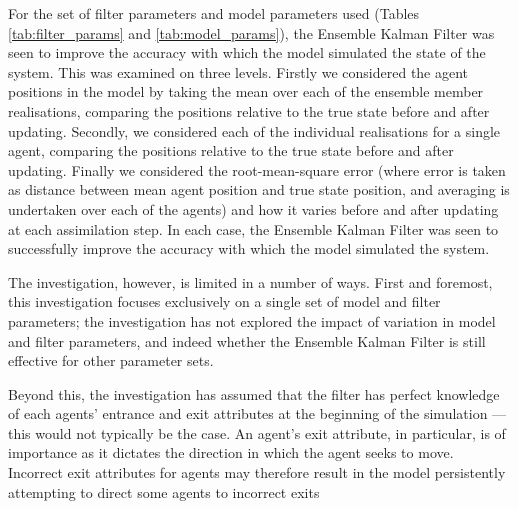For the set of filter parameters and model parameters used (Tables
\ref{tab:filter_params} and \ref{tab:model_params}), the Ensemble Kalman Filter
was seen to improve the accuracy with which the model simulated the state of the
system.
This was examined on three levels.
Firstly we considered the agent positions in the model by taking the mean over
each of the ensemble member realisations, comparing the positions relative to
the true state before and after updating.
Secondly, we considered each of the individual realisations for a single agent,
comparing the positions relative to the true state before and after updating.
Finally we considered the root-mean-square error (where error is taken as
distance between mean agent position and true state position, and  averaging is
undertaken over each of the agents) and how it varies before and after updating
at each assimilation step.
In each case, the Ensemble Kalman Filter was seen to successfully improve the
accuracy with which the model simulated the system.

The investigation, however, is limited in a number of ways.
First and foremost, this investigation focuses exclusively on a single set of
model and filter parameters; the investigation has not explored the impact of
variation in model and filter parameters, and indeed whether the Ensemble Kalman
Filter is still effective for other parameter sets.

Beyond this, the investigation has assumed that the filter has perfect knowledge
of each agents' entrance and exit attributes at the beginning of the simulation
--- this would not typically be the case.
An agent's exit attribute, in particular, is of importance as it dictates the
direction in which the agent seeks to move.
Incorrect exit attributes for agents may therefore result in the model
persistently attempting to direct some agents to incorrect exits


